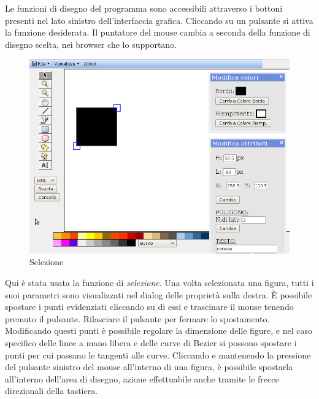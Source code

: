 Le funzioni di disegno del programma sono accessibili attraverso i bottoni presenti nel lato sinistro dell'interfaccia grafica. Cliccando su un pulsante si attiva la funzione desiderata. Il puntatore del mouse cambia a seconda della funzione di disegno scelta, nei browser che lo supportano.
 
 
\begin{figure}[!ht]
\centering
\includegraphics[scale=0.5]{images/selezione.png}
\caption{Selezione}
\end{figure}
 
Qui \`e stata usata la funzione di \textit{selezione}. Una volta selezionata una figura, tutti i suoi parametri sono visualizzati nel dialog delle propriet\` a sulla destra. \`E possibile spostare i punti evidenziati cliccando su di essi e trascinare il mouse tenendo premuto il pulsante. Rilasciare il pulsante per fermare lo spostamento. Modificando questi punti \`e possibile regolare la dimensione delle figure, e nel caso specifico delle linee a mano libera e delle curve di Bezier si possono spostare i punti per cui passano le tangenti alle curve. Cliccando e mantenendo la pressione del pulsante sinistro del mouse all'interno di una figura, \`e possibile spostarla all'interno dell'area di disegno, azione effettuabile anche tramite le frecce direzionali della tastiera.
 
